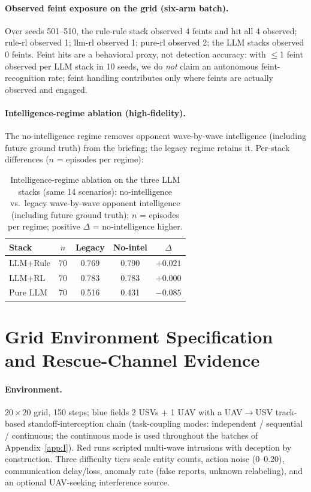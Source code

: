 \documentclass[sigconf,anonymous]{aamas}
\begin{document}
\paragraph{Observed feint exposure on the grid (six-arm batch).}
Over seeds 501--510, the rule-rule stack observed 4 feints and hit all 4 observed; rule-rl observed 1; llm-rl observed 1; pure-rl observed 2; the LLM stacks observed 0 feints. Feint hits are a behavioral proxy, not detection accuracy: with $\leq$1 feint observed per LLM stack in 10 seeds, we do \emph{not} claim an autonomous feint-recognition rate; feint handling contributes only where feints are actually observed and engaged.

\paragraph{Intelligence-regime ablation (high-fidelity).}
The no-intelligence regime removes opponent wave-by-wave intelligence (including future ground truth) from the briefing; the legacy regime retains it. Per-stack differences ($n$ = episodes per regime):

\begin{table}[h]
\centering
\caption{Intelligence-regime ablation on the three LLM stacks (same 14 scenarios): no-intelligence vs.\ legacy wave-by-wave opponent intelligence (including future ground truth); $n$ = episodes per regime; positive $\Delta$ = no-intelligence higher.}
\label{tab:nointel}
\footnotesize
\begin{tabular}{@{}lcccc@{}}
\toprule
Stack & $n$ & Legacy & No-intel & $\Delta$ \\
\midrule
LLM+Rule & 70 & 0.769 & 0.790 & $+0.021$ \\
LLM+RL & 70 & 0.783 & 0.783 & $+0.000$ \\
Pure LLM & 70 & 0.516 & 0.431 & $-0.085$ \\
\bottomrule
\end{tabular}
\end{table}

\section{Grid Environment Specification and Rescue-Channel Evidence}\label{app:H}

\paragraph{Environment.}
$20 \times 20$ grid, 150 steps; blue fields 2 USVs + 1 UAV with a UAV$\to$USV track-based standoff-interception chain (task-coupling modes: independent / sequential / continuous; the continuous mode is used throughout the batches of Appendix~\ref{app:I}). Red runs scripted multi-wave intrusions with deception by construction. Three difficulty tiers scale entity counts, action noise (0--0.20), communication delay/loss, anomaly rate (false reports, unknown relabeling), and an optional UAV-seeking interference source.
\end{document}
